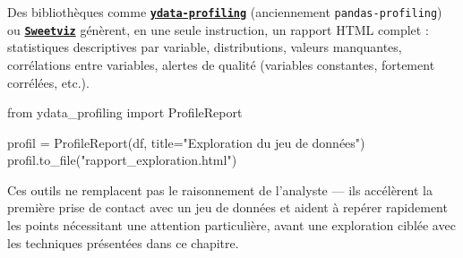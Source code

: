 \documentclass[
  french,
  letterpaper,
  open=any]{scrbook}
\newenvironment{Shaded}{\begin{snugshade}}{\end{snugshade}}
\newcommand{\ImportTok}[1]{\textcolor[rgb]{0.00,0.46,0.62}{#1}}
\newcommand{\NormalTok}[1]{\textcolor[rgb]{0.00,0.23,0.31}{#1}}
\newcommand{\OperatorTok}[1]{\textcolor[rgb]{0.37,0.37,0.37}{#1}}
\newcommand{\StringTok}[1]{\textcolor[rgb]{0.13,0.47,0.30}{#1}}
\theoremstyle{definition}
\theoremstyle{definition}
\theoremstyle{remark}
\begin{document}
\begin{tcolorbox}[enhanced jigsaw, arc=.35mm, bottomrule=.15mm, bottomtitle=1mm, breakable, colback=white, colbacktitle=quarto-callout-important-color!10!white, colframe=quarto-callout-important-color-frame, coltitle=black, left=2mm, leftrule=.75mm, opacityback=0, opacitybacktitle=0.6, rightrule=.15mm, title=\textcolor{quarto-callout-important-color}{\faExclamation}\hspace{0.5em}{Zoom sur les tendances : rapports d'exploration automatisés}, titlerule=0mm, toprule=.15mm, toptitle=1mm]

Des bibliothèques comme
\textbf{\href{https://github.com/ydataai/ydata-profiling}{\texttt{ydata-profiling}}}
(anciennement \texttt{pandas-profiling}) ou
\textbf{\href{https://github.com/fbdesignpro/sweetviz}{\texttt{Sweetviz}}}
génèrent, en une seule instruction, un rapport HTML complet :
statistiques descriptives par variable, distributions, valeurs
manquantes, corrélations entre variables, alertes de qualité (variables
constantes, fortement corrélées, etc.).

\begin{Shaded}
\begin{Highlighting}[]
\ImportTok{from}\NormalTok{ ydata\_profiling }\ImportTok{import}\NormalTok{ ProfileReport}

\NormalTok{profil }\OperatorTok{=}\NormalTok{ ProfileReport(df, title}\OperatorTok{=}\StringTok{"Exploration du jeu de données"}\NormalTok{)}
\NormalTok{profil.to\_file(}\StringTok{"rapport\_exploration.html"}\NormalTok{)}
\end{Highlighting}
\end{Shaded}

Ces outils ne remplacent pas le raisonnement de l'analyste --- ils
accélèrent la première prise de contact avec un jeu de données et aident
à repérer rapidement les points nécessitant une attention particulière,
avant une exploration ciblée avec les techniques présentées dans ce
chapitre.

\end{tcolorbox}
\end{document}
